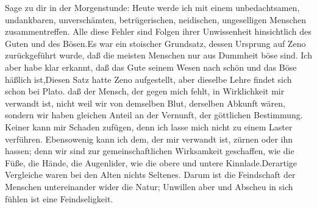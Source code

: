 \documentclass[12pt,ngerman,parskip=half]{scrartcl}
\begin{document}
Sage zu dir in der Morgenstunde: Heute werde ich mit einem unbedachtsamen, undankbaren, unverschämten, betrügerischen, neidischen, ungeselligen Menschen zusammentreffen. Alle diese Fehler sind Folgen ihrer Unwissenheit hinsichtlich des Guten und des Bösen.Es war ein stoischer Grundsatz, dessen Ursprung auf Zeno zurückgeführt wurde, daß die meisten Menschen nur aus Dummheit böse sind. Ich aber habe klar erkannt, daß das Gute seinem Wesen nach schön und das Böse häßlich ist,Diesen Satz hatte Zeno aufgestellt, aber dieselbe Lehre findet sich schon bei Plato. daß der Mensch, der gegen mich fehlt, in Wirklichkeit mir verwandt ist, nicht weil wir von demselben Blut, derselben Abkunft wären, sondern wir haben gleichen Anteil an der Vernunft, der göttlichen Bestimmung. Keiner kann mir Schaden zufügen, denn ich lasse mich nicht zu einem Laster verführen. Ebensowenig kann ich dem, der mir verwandt ist, zürnen oder ihn hassen; denn wir sind zur gemeinschaftlichen Wirksamkeit geschaffen, wie die Füße, die Hände, die Augenlider, wie die obere und untere Kinnlade.Derartige Vergleiche waren bei den Alten nichts Seltenes. Darum ist die Feindschaft der Menschen untereinander wider die Natur; Unwillen aber und Abscheu in sich fühlen ist eine Feindseligkeit.
\end{document}
